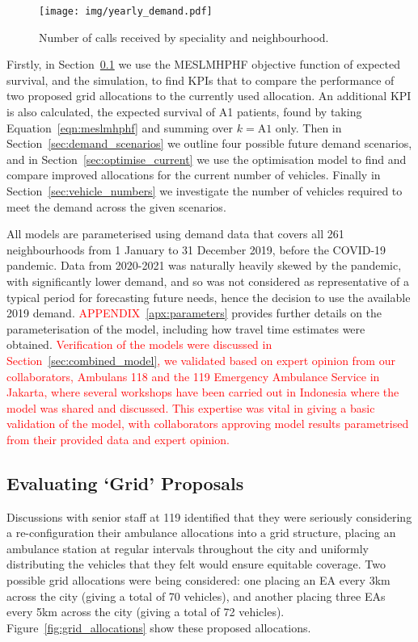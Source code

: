 \documentclass[numbers,webpdf,imaman]{ima-authoring-template}%
\begin{document}
\begin{figure}
\begin{center}
\texttt{[image: img/yearly\_demand.pdf]}
\end{center}
\caption{Number of calls received by speciality and neighbourhood.}
\label{fig:yearly_demand}
\end{figure}


Firstly, in Section~\ref{sec:analysis_grid} we use the MESLMHPHF objective
function of expected survival, and the simulation, to find KPIs that to compare
the performance of two proposed grid allocations to the currently used
allocation. An additional KPI is also calculated, the expected survival of A1
patients, found by taking Equation~\ref{eqn:meslmhphf} and summing over
$k = \text{A1}$ only.
Then in Section~\ref{sec:demand_scenarios} we outline four possible
future demand scenarios, and in Section~\ref{sec:optimise_current} we use the
optimisation model to find and compare improved allocations for the current
number of vehicles. Finally in Section~\ref{sec:vehicle_numbers} we investigate
the number of vehicles required to meet the demand across the given scenarios.

All models are parameterised using demand data that covers all 261
neighbourhoods from 1 January to 31 December 2019, before the COVID-19
pandemic. Data from 2020-2021 was naturally heavily skewed by the pandemic,
with significantly lower demand, and so was not considered as representative
of a typical period for forecasting future needs, hence the decision to use
the available 2019 demand. \textcolor{red}{APPENDIX}~\ref{apx:parameters}
provides further details on the parameterisation of the model, including how
travel time estimates were obtained.
\textcolor{red}{Verification of the models were discussed in
Section~\ref{sec:combined_model}, we validated based on expert opinion from
our collaborators, Ambulans 118 and the 119 Emergency Ambulance Service in
Jakarta, where several workshops have been carried out in Indonesia where the
model was shared and discussed. This expertise was vital in giving a basic
validation of the model, with collaborators approving model results
parametrised from their provided data and expert opinion.}


\subsection{Evaluating `Grid' Proposals}\label{sec:analysis_grid}
Discussions with senior staff at 119 identified that they were seriously
considering a re-configuration their ambulance allocations into a grid
structure, placing an ambulance station at regular intervals throughout the city
and uniformly distributing the vehicles that they felt would ensure equitable
coverage. Two possible grid allocations were being considered: one placing an
EA every 3km across the city (giving a total of 70 vehicles), and another
placing three EAs every 5km across the city (giving a total of 72 vehicles).
Figure~\ref{fig:grid_allocations} show these proposed allocations.
\end{document}
